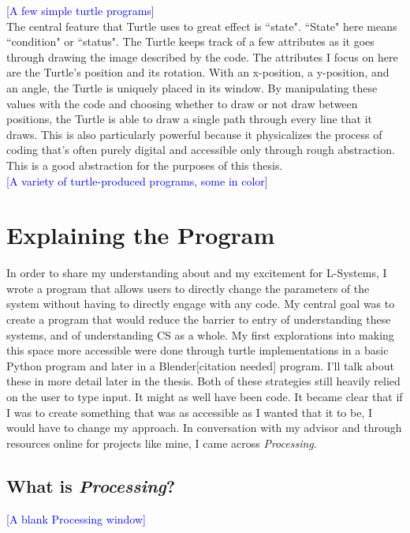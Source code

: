 \documentclass[12pt,twoside]{reedthesis}
\begin{document}
	\textcolor{blue}{[A few simple turtle programs]}\\
	
	The central feature that Turtle uses to great effect is ``state". ``State" here means ``condition" or ``status". The Turtle keeps track of a few attributes as it goes through drawing the image described by the code. The attributes I focus on here are the Turtle's position and its rotation. With an x-position, a y-position, and an angle, the Turtle is uniquely placed in its window. By manipulating these values with the code and choosing whether to draw or not draw between positions, the Turtle is able to draw a single path through every line that it draws. This is also particularly powerful because it physicalizes the process of coding that's often purely digital and accessible only through rough abstraction. This is a good abstraction for the purposes of this thesis.\\
	
	\textcolor{blue}{[A variety of turtle-produced programs, some in color]}


\chapter{Explaining the Program}

	In order to share my understanding about and my excitement for L-Systems, I wrote a program that allows users to directly change the parameters of the system without having to directly engage with any code. My central goal was to create a program that would reduce the barrier to entry of understanding these systems, and of understanding CS as a whole. My first explorations into making this space more accessible were done through turtle implementations in a basic Python program and later in a Blender[citation needed] program. I'll talk about these in more detail later in the thesis. Both of these strategies still heavily relied on the user to type input. It might as well have been code. It became clear that if I was to create something that was as accessible as I wanted that it to be, I would have to change my approach. In conversation with my advisor and through resources online for projects like mine, I came across \textit{Processing}.
	
\section{What is \textit{Processing}?}

	\textcolor{blue}{[A blank Processing window]}\\
\end{document}
